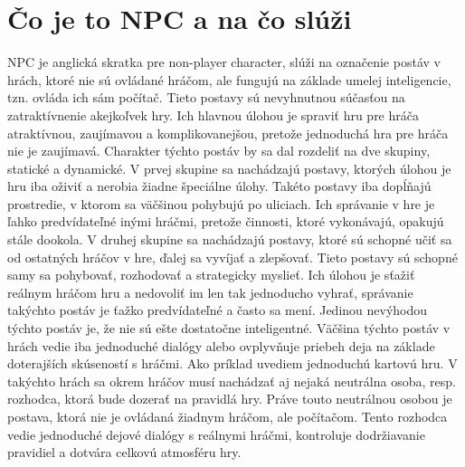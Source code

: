 \documentclass[10pt,twoside,slovak,a4paper]{article}
\begin{document}
\section{Čo je to NPC a na čo slúži}  \label{nejaka}
\quad NPC je anglická skratka pre non-player character, slúži na označenie postáv v hrách, ktoré nie sú ovládané hráčom, ale fungujú na základe umelej inteligencie, tzn. ovláda ich sám počítač. Tieto postavy sú nevyhnutnou súčasťou na zatraktívnenie akejkoľvek hry. Ich hlavnou úlohou je spraviť hru pre hráča atraktívnou, zaujímavou a komplikovanejšou, pretože jednoduchá hra pre hráča nie je zaujímavá. Charakter týchto postáv by sa dal rozdeliť na dve skupiny, statické a dynamické. V prvej skupine sa nachádzajú postavy, ktorých úlohou je hru iba oživiť a nerobia žiadne špeciálne úlohy. Takéto postavy iba dopĺňajú prostredie, v ktorom sa väčšinou pohybujú po uliciach. Ich správanie v hre je ľahko predvídateľné inými hráčmi, pretože činnosti, ktoré vykonávajú, opakujú stále dookola. V druhej skupine sa nachádzajú postavy, ktoré sú schopné učiť sa od ostatných hráčov v hre, ďalej sa vyvíjať a zlepšovať. Tieto postavy sú schopné samy sa pohybovať, rozhodovať a strategicky myslieť. Ich úlohou je sťažiť reálnym hráčom hru a nedovoliť im len tak jednoducho vyhrať, správanie takýchto postáv je ťažko predvídateľné a často sa mení. Jedinou nevýhodou týchto postáv je, že nie sú ešte dostatočne inteligentné. Väčšina týchto postáv v hrách vedie iba jednoduché dialógy alebo ovplyvňuje priebeh deja na základe doterajších skúseností s hráčmi. Ako príklad uvediem jednoduchú kartovú hru. V takýchto hrách sa okrem hráčov musí nachádzať aj nejaká neutrálna osoba, resp. rozhodca, ktorá bude dozerať na pravidlá hry. Práve touto neutrálnou osobou je postava, ktorá nie je ovládaná žiadnym hráčom, ale počítačom. Tento rozhodca vedie jednoduché dejové dialógy s reálnymi hráčmi, kontroluje dodržiavanie pravidiel a dotvára celkovú atmosféru hry. ~\cite{NPC, AI} 
\begin{figure}[tbh]
\centering
\end{figure}
\end{document}
